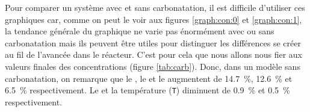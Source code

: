 \documentclass[11pt]{report}
\begin{document}
      \par
      Pour comparer un système avec et sans carbonatation,
      il est difficile d'utiliser ces graphiques car,
      comme on peut le voir aux figures \ref{graph:con:0} et \ref{graph:con:1},
      la tendance générale du graphique ne varie pas énormément avec ou sans carbonatation mais ils peuvent être utiles 
      pour distinguer les différences se créer au fil de l'avancée dans le réacteur.
      C'est pour cela que nous allons nous fier aux valeurs finales des concentrations (figure \ref{tab:carb}).
      Donc, dans un modèle sans carbonatation, on remarque que le , le 
      et le  augmentent de \SI{14.7}{\percent}, \SI{12.6}{\percent} et \SI{6.5}{\percent} respectivement.
      Le  et la température (\verb|T|) diminuent de \SI{0.9}{\percent} et \SI{0.5}{\percent} respectivement.
\end{document}
